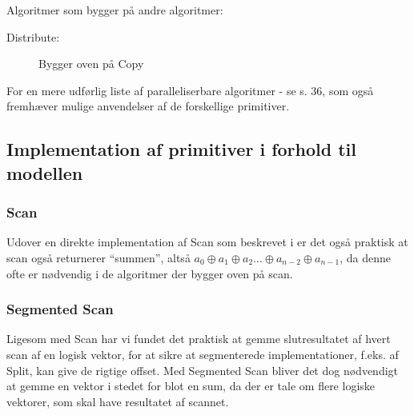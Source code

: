 Algoritmer som bygger på andre algoritmer:
\begin{description}
 \item [Distribute:] Bygger oven på Copy
\end{description}

For en mere udførlig liste af paralleliserbare algoritmer - se \cite{ble} s. 36, som også fremhæver mulige anvendelser af de forskellige primitiver.

\subsection{Implementation af primitiver i forhold til modellen}
\subsubsection{Scan}

Udover en direkte implementation af Scan som beskrevet i \cite{ble} er det også praktisk at scan også returnerer ``summen'', altså $a_0 \oplus a_1 \oplus a_2 \ldots \oplus a_{n-2} \oplus a_{n-1}$, da denne ofte er nødvendig i de algoritmer der bygger oven på scan.

\subsubsection{Segmented Scan}

Ligesom med Scan har vi fundet det praktisk at gemme slutresultatet af hvert scan af en logisk vektor, for at sikre at segmenterede implementationer, f.eks. af Split, kan give de rigtige offset. Med Segmented Scan bliver det dog nødvendigt at gemme en vektor i stedet for blot en sum, da der er tale om flere logiske vektorer, som skal have resultatet af scannet.

